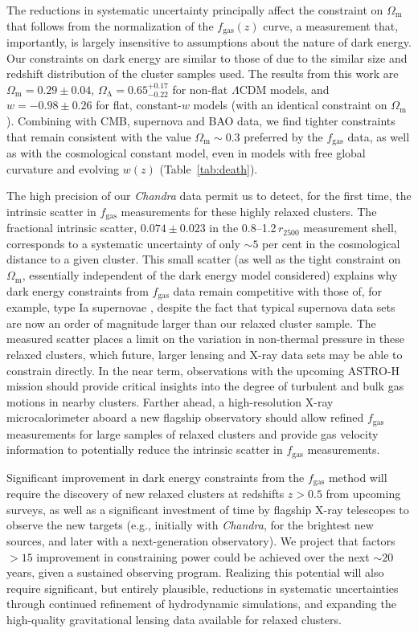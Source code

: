 \documentclass[useAMS,usenatbib,usegraphicx]{mn2e}
\newcommand*{\mysub}[2]{\ensuremath{#1_{\mathrm{#2}}}}
\newcommand*{\Omegam}{\mysub{\Omega}{m}}
\newcommand*{\Omegal}{\mysub{\Omega}{\Lambda}}
\newcommand*{\fgas}{\mysub{f}{gas}}
\newcommand*{\LCDM}{\ensuremath{\Lambda}CDM}
\newcommand*{\tabref}{Table}
\newcommand*{\Chandra}{{\it Chandra}}
\newcommand*{\arsemf}{\citetalias{Allen0706.0033}}
\begin{document}
The reductions in systematic uncertainty principally affect the constraint on \Omegam{} that follows from the normalization of the $\fgas(z)$ curve, a measurement that, importantly, is largely insensitive to assumptions about the nature of dark energy. Our constraints on dark energy are similar to those of \arsemf{} due to the similar size and redshift distribution of the cluster samples used. The results from this work are $\Omegam=0.29\pm0.04$, $\Omegal=0.65^{+0.17}_{-0.22}$ for non-flat \LCDM{} models, and $w=-0.98\pm0.26$ for flat, constant-$w$ models (with an identical constraint on $\Omegam$). Combining with CMB, supernova and BAO data, we find tighter constraints that remain consistent with the value $\Omegam\sim0.3$ preferred by the \fgas{} data, as well as with the cosmological constant model, even in models with free global curvature and evolving $w(z)$ (\tabref~\ref{tab:death}).

The high precision of our \Chandra{} data permit us to detect, for the first time, the intrinsic scatter in \fgas{} measurements for these highly relaxed clusters. The fractional intrinsic scatter, $0.074\pm0.023$ in the 0.8--1.2\,$r_{2500}$ measurement shell, corresponds to a systematic uncertainty of only $\sim5$ per cent in the cosmological distance to a given cluster. This small scatter (as well as the tight constraint on $\Omegam$, essentially independent of the dark energy model considered) explains why dark energy constraints from \fgas{} data remain competitive with those of, for example, type Ia supernovae \citep{Suzuki1105.3470}, despite the fact that typical supernova data sets are now an order of magnitude larger than our relaxed cluster sample. The measured scatter places a limit on the variation in non-thermal pressure in these relaxed clusters, which future, larger lensing and X-ray data sets may be able to constrain directly. In the near term, observations with the upcoming ASTRO-H mission \citep{Takahashi1010.4972} should provide critical insights into the degree of turbulent and bulk gas motions in nearby clusters. Farther ahead, a high-resolution X-ray microcalorimeter aboard a new flagship observatory should allow refined \fgas{} measurements for large samples of relaxed clusters and provide gas velocity information to potentially reduce the intrinsic scatter in \fgas{} measurements.

Significant improvement in dark energy constraints from the \fgas{} method will require the discovery of new relaxed clusters at redshifts $z>0.5$ from upcoming surveys, as well as a significant investment of time by flagship X-ray telescopes to observe the new targets (e.g., initially with \Chandra{}, for the brightest new sources, and later with a next-generation observatory). We project that factors $>15$ improvement in constraining power could be achieved over the next $\sim20$ years, given a sustained observing program. Realizing this potential will also require significant, but entirely plausible, reductions in systematic uncertainties through continued refinement of hydrodynamic simulations, and expanding the high-quality gravitational lensing data available for relaxed clusters.
\end{document}
